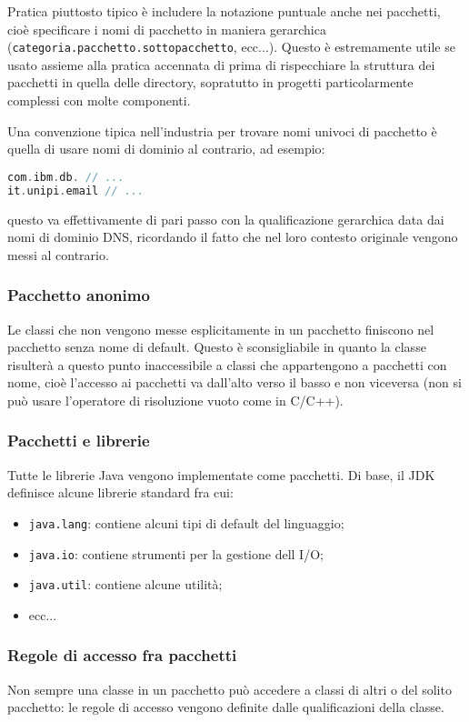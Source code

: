\documentclass[a4paper,11pt]{article}
\begin{document}
Pratica piuttosto tipico è includere la notazione puntuale anche nei pacchetti, cioè specificare i nomi di pacchetto in maniera gerarchica (\lstinline|categoria.pacchetto.sottopacchetto|, ecc...).
Questo è estremamente utile se usato assieme alla pratica accennata di prima di rispecchiare la struttura dei pacchetti in quella delle directory, sopratutto in progetti particolarmente complessi con molte componenti.

Una convenzione tipica nell'industria per trovare nomi univoci di pacchetto è quella di usare nomi di dominio al contrario, ad esempio:
\begin{lstlisting}[language=C++, style=codestyle]
com.ibm.db. // ...
it.unipi.email // ...
\end{lstlisting}
questo va effettivamente di pari passo con la qualificazione gerarchica data dai nomi di dominio DNS, ricordando il fatto che nel loro contesto originale vengono messi al contrario.

\subsubsection{Pacchetto anonimo}
Le classi che non vengono messe esplicitamente in un pacchetto finiscono nel pacchetto senza nome di default.
Questo è sconsigliabile in quanto la classe risulterà a questo punto inaccessibile a classi che appartengono a pacchetti con nome, cioè l'accesso ai pacchetti va dall'alto verso il basso e non viceversa (non si può usare l'operatore di risoluzione vuoto come in C/C++).

\subsubsection{Pacchetti e librerie}
Tutte le librerie Java vengono implementate come pacchetti. Di base, il JDK definisce alcune librerie standard fra cui:
\begin{itemize}
	\item \lstinline|java.lang|: contiene alcuni tipi di default del linguaggio;
	\item \lstinline|java.io|: contiene strumenti per la gestione dell I/O; 
	\item \lstinline|java.util|: contiene alcune utilità;
	\item ecc...
\end{itemize}

\subsubsection{Regole di accesso fra pacchetti}
Non sempre una classe in un pacchetto può accedere a classi di altri o del solito pacchetto: le regole di accesso vengono definite dalle qualificazioni della classe. 
\end{document}
